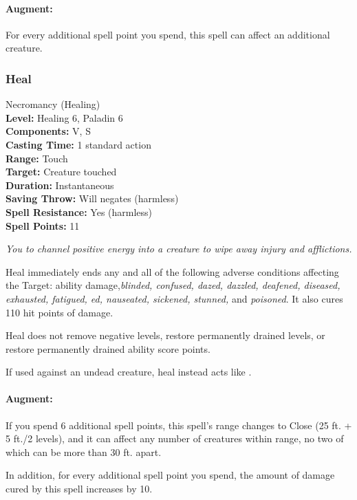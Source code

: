 \paragraph{Augment:} For every additional spell point you spend, this spell can affect an additional creature.

\subsubsection{Heal}
\label{Spell:Heal}
Necromancy (Healing)
\\ \textbf{Level:} Healing 6, Paladin 6
\\ \textbf{Components:} V, S
\\ \textbf{Casting Time:} 1 standard action
\\ \textbf{Range:} Touch
\\ \textbf{Target:} Creature touched
\\ \textbf{Duration:} Instantaneous
\\ \textbf{Saving Throw:} Will negates (harmless)
\\ \textbf{Spell Resistance:} Yes (harmless)
\\ \textbf{Spell Points:} 11

\emph{You to channel positive energy into a creature to wipe away injury and afflictions.} 

Heal immediately ends any and all of the following adverse conditions affecting the Target: 
ability damage,\emph{blinded, confused, dazed, dazzled, deafened, diseased, exhausted, fatigued, ed, nauseated, sickened, stunned,} and \emph{poisoned}.
It also cures 110 hit points of damage.

Heal does not remove negative levels, restore permanently drained levels, or restore permanently drained ability score points.

If used against an undead creature, heal instead acts like .

\paragraph{Augment:} If you spend 6 additional spell points, 
this spell's range changes to Close (25 ft. + 5 ft./2 levels), and it can affect any number of creatures within range,
no two of which can be more than 30 ft. apart.

In addition, for every additional spell point you spend, the amount of damage cured by this spell increases by 10.

